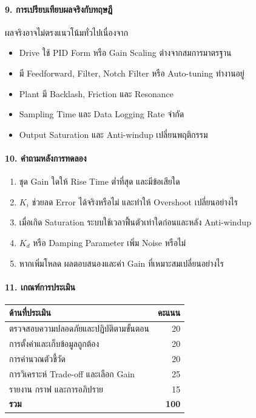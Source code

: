 \paragraph{9. การเปรียบเทียบผลจริงกับทฤษฎี}

ผลจริงอาจไม่ตรงแนวโน้มทั่วไปเนื่องจาก

\begin{itemize}
    \item Drive ใช้ PID Form หรือ Gain Scaling ต่างจากสมการมาตรฐาน
    \item มี Feedforward, Filter, Notch Filter หรือ Auto-tuning ทำงานอยู่
    \item Plant มี Backlash, Friction และ Resonance
    \item Sampling Time และ Data Logging Rate จำกัด
    \item Output Saturation และ Anti-windup เปลี่ยนพฤติกรรม
\end{itemize}

\paragraph{10. คำถามหลังการทดลอง}

\begin{enumerate}
    \item ชุด Gain ใดให้ Rise Time ต่ำที่สุด และมีข้อเสียใด
    \item $K_i$ ช่วยลด Error ได้จริงหรือไม่ และทำให้ Overshoot เปลี่ยนอย่างไร
    \item เมื่อเกิด Saturation ระบบใช้เวลาฟื้นตัวเท่าใดก่อนและหลัง Anti-windup
    \item $K_d$ หรือ Damping Parameter เพิ่ม Noise หรือไม่
    \item หากเพิ่มโหลด ผลตอบสนองและค่า Gain ที่เหมาะสมเปลี่ยนอย่างไร
\end{enumerate}

\paragraph{11. เกณฑ์การประเมิน}

\begin{table}[htbp]
    \centering
    \begin{tabular}{l r}
        \hline
        \textbf{ด้านที่ประเมิน} & \textbf{คะแนน} \\
        \hline
        ตรวจสอบความปลอดภัยและปฏิบัติตามขั้นตอน & 20 \\
        การตั้งค่าและเก็บข้อมูลถูกต้อง & 20 \\
        การคำนวณตัวชี้วัด & 20 \\
        การวิเคราะห์ Trade-off และเลือก Gain & 25 \\
        รายงาน กราฟ และการอภิปราย & 15 \\
        \textbf{รวม} & \textbf{100} \\
        \hline
    \end{tabular}
\end{table}



